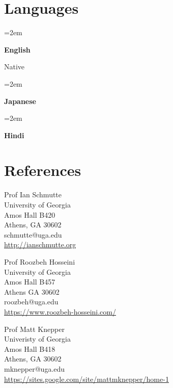 \documentclass[]{article}
\newlength{\spacebox}
\newcommand{\lan}[2]{
    \noindent\hangindent=2em\hangafter=0
    \parbox{\spacebox}{%
        \textbf{#1}} %
     #2 \par
}%
\begin{document}
\section*{Languages}
\lan{English}{Native}
\lan{Japanese}{}
\lan{Hindi}{}

\section*{References}
\begin{minipage}[c]{0.34\textwidth}

  Prof Ian Schmutte\\
  University of Georgia\\
  Amos Hall B420\\
  Athens, GA 30602 \\
  schmutte@uga.edu\\
  \url{http://ianschmutte.org}
\end{minipage}
\begin{minipage}[c]{0.33\textwidth}

  Prof Roozbeh Hosseini\\
  University of Georgia\\
  Amos Hall B457\\
  Athens GA 30602\\
  roozbeh@uga.edu\\
  \url{https://www.roozbeh-hosseini.com/}
\end{minipage}
\begin{minipage}[c]{0.33\textwidth}

  Prof Matt Knepper\\
  Univeristy of Georgia\\
  Amos Hall B418\\
  Athens, GA 30602\\
  mknepper@uga.edu\\
  \url{https://sites.google.com/site/mattmknepper/home-1}
\end{minipage}
\end{document}
